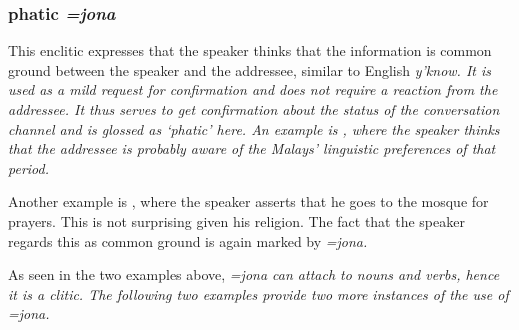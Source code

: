 \subsubsection{phatic \em =jona\em}\label{sec:morph:=jona}
This enclitic expresses that the speaker thinks that the information is common ground between the speaker and the addressee, similar to English \em y'know\em. It is used as a mild request for confirmation   and does not require a reaction from the addressee. It thus serves to get confirmation about the status of the conversation channel and is glossed as `phatic' here. An example is , where the speaker thinks that the addressee is probably aware of the Malays' linguistic preferences of that period.


Another example is , where the speaker asserts that he goes to the mosque for prayers. This is not surprising given his religion. The fact that the speaker regards this as common ground is again marked by \em =jona\em.





As seen in the two examples above, \em =jona \em can attach to nouns and verbs, hence it is a clitic. The following two examples provide two more instances of the use of \em =jona\em.

